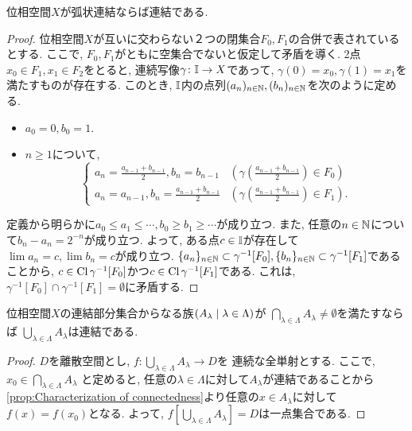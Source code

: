 \documentclass[uplatex, dvipdfmx, a4paper, 12pt, class=jsbook, crop=false]{standalone}
\begin{document}
\begin{proposition}
	\label{prop:PathCtd>Ctd}
	位相空間$ X $が弧状連結ならば連結である.
\end{proposition}

\begin{proof}
	位相空間$ X $が互いに交わらない２つの閉集合$ F_0, F_1 $の合併で表されているとする.
	ここで, $ F_0, F_1 $がともに空集合でないと仮定して矛盾を導く.
	2点$ x_0 \in F_1, x_1 \in F_2 $をとると, 連続写像$ \gamma \colon \mathbb{I} \to X $であって,
	$ \gamma(0) = x_0, \gamma(1) = x_1 $を満たすものが存在する.
	このとき, $ \mathbb{I} $内の点列$ (a_n)_{n\in \mathbb{N}}, (b_n)_{n \in \mathbb{N}} $を次のように定める.
	\begin{itemize}
		\item $ a_0 = 0, b_0 = 1 $.
		\item $ n \geq 1 $について,
		\begin{equation}
			\begin{cases}
				a_n = \frac{a_{n-1} + b_{n-1}}{2}, b_n = b_{n-1} & (\gamma\left(\frac{a_{n-1} + b_{n-1}}{2}\right) \in F_0) \\
				a_n = a_{n-1}, b_n = \frac{a_{n-1} + b_{n-1}}{2} & (\gamma\left(\frac{a_{n-1} + b_{n-1}}{2}\right) \in F_1).
			\end{cases}
		\end{equation}
	\end{itemize}
	定義から明らかに$ a_0 \leq a_1 \leq \cdots, b_0 \geq b_1 \geq \cdots $が成り立つ.
	また, 任意の$ n \in \mathbb{N} $について$ b_n - a_n = 2^{-n} $が成り立つ.
	よって, ある点$ c \in \mathbb{I} $が存在して$ \lim a_n = c, \lim b_n = c $が成り立つ.
	$ \{a_n\}_{n \in \mathbb{N}} \subset \gamma^{-1}[F_0], \{b_n\}_{n \in \mathbb{N}} \subset \gamma^{-1}[F_1] $であることから,
	$ c \in \mathop{\mathrm{Cl}}\nolimits{\gamma^{-1}[F_0]} $かつ$ c \in \mathop{\mathrm{Cl}}\nolimits{\gamma^{-1}[F_1]} $である.
	これは, $ \gamma^{-1}[F_0] \cap \gamma^{-1}[F_1] = \emptyset $に矛盾する.
\end{proof}

\begin{proposition}
	\label{prop:Sum of every connected subsets in a family having intersection is connected}
	位相空間$ X $の連結部分集合からなる族$ \setfamily{A_\lambda}{\lambda \in \Lambda} $が
	$ \bigcap_{\lambda \in \Lambda} A_\lambda \neq \emptyset $を満たすならば
	$ \bigcup_{\lambda \in \Lambda} A_\lambda $は連結である.
\end{proposition}

\begin{proof}
	$ D $を離散空間とし, $ f \colon \bigcup_{\lambda \in \Lambda} A_\lambda \to D $を
	連続な全単射とする. ここで, $ x_0 \in \bigcap_{\lambda \in \Lambda} A_\lambda $
	と定めると, 任意の$ \lambda \in \Lambda $に対して$ A_\lambda $が連結であることから
	\cref{prop:Characterization of connectedness}より任意の$ x \in A_\lambda $に対して
	$ f(x) = f(x_0) $となる.
	よって, $ f[\bigcup_{\lambda \in \Lambda} A_\lambda] = D $は一点集合である.
\end{proof}
\end{document}
